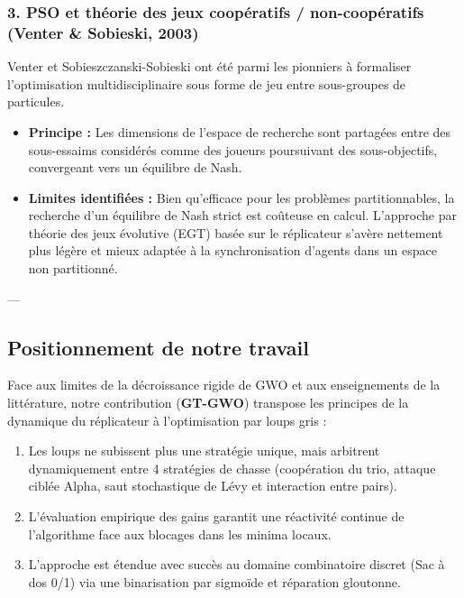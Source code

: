 \subsubsection{3. PSO et théorie des jeux coopératifs / non-coopératifs (Venter \& Sobieski, 2003)}
Venter et Sobieszczanski-Sobieski \cite{venter2003particle} ont été parmi les pionniers à formaliser l'optimisation multidisciplinaire sous forme de jeu entre sous-groupes de particules.
\begin{itemize}
    \item \textbf{Principe :} Les dimensions de l'espace de recherche sont partagées entre des sous-essaims considérés comme des joueurs poursuivant des sous-objectifs, convergeant vers un équilibre de Nash.
    \item \textbf{Limites identifiées :} Bien qu'efficace pour les problèmes partitionnables, la recherche d'un équilibre de Nash strict est coûteuse en calcul. L'approche par théorie des jeux évolutive (EGT) basée sur le réplicateur s'avère nettement plus légère et mieux adaptée à la synchronisation d'agents dans un espace non partitionné.
\end{itemize}

---

\subsection{Positionnement de notre travail}
Face aux limites de la décroissance rigide de GWO et aux enseignements de la littérature, notre contribution (\textbf{GT-GWO}) transpose les principes de la dynamique du réplicateur à l'optimisation par loups gris :
\begin{enumerate}
    \item Les loups ne subissent plus une stratégie unique, mais arbitrent dynamiquement entre 4 stratégies de chasse (coopération du trio, attaque ciblée Alpha, saut stochastique de Lévy et interaction entre pairs).
    \item L'évaluation empirique des gains garantit une réactivité continue de l'algorithme face aux blocages dans les minima locaux.
    \item L'approche est étendue avec succès au domaine combinatoire discret (Sac à dos 0/1) via une binarisation par sigmoïde et réparation gloutonne.
\end{enumerate}
